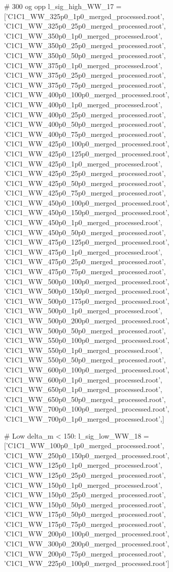 # 300 og opp
l_sig_high_WW_17 = ['C1C1_WW_325p0_1p0_merged_processed.root',
'C1C1_WW_325p0_25p0_merged_processed.root',
'C1C1_WW_350p0_1p0_merged_processed.root',
'C1C1_WW_350p0_25p0_merged_processed.root',
'C1C1_WW_350p0_50p0_merged_processed.root',
'C1C1_WW_375p0_1p0_merged_processed.root',
'C1C1_WW_375p0_25p0_merged_processed.root',
'C1C1_WW_375p0_75p0_merged_processed.root',
'C1C1_WW_400p0_100p0_merged_processed.root',
'C1C1_WW_400p0_1p0_merged_processed.root',
'C1C1_WW_400p0_25p0_merged_processed.root',
'C1C1_WW_400p0_50p0_merged_processed.root',
'C1C1_WW_400p0_75p0_merged_processed.root',
'C1C1_WW_425p0_100p0_merged_processed.root',
'C1C1_WW_425p0_125p0_merged_processed.root',
'C1C1_WW_425p0_1p0_merged_processed.root',
'C1C1_WW_425p0_25p0_merged_processed.root',
'C1C1_WW_425p0_50p0_merged_processed.root',
'C1C1_WW_425p0_75p0_merged_processed.root',
'C1C1_WW_450p0_100p0_merged_processed.root',
'C1C1_WW_450p0_150p0_merged_processed.root',
'C1C1_WW_450p0_1p0_merged_processed.root',
'C1C1_WW_450p0_50p0_merged_processed.root',
'C1C1_WW_475p0_125p0_merged_processed.root',
'C1C1_WW_475p0_1p0_merged_processed.root',
'C1C1_WW_475p0_25p0_merged_processed.root',
'C1C1_WW_475p0_75p0_merged_processed.root',
'C1C1_WW_500p0_100p0_merged_processed.root',
'C1C1_WW_500p0_150p0_merged_processed.root',
'C1C1_WW_500p0_175p0_merged_processed.root',
'C1C1_WW_500p0_1p0_merged_processed.root',
'C1C1_WW_500p0_200p0_merged_processed.root',
'C1C1_WW_500p0_50p0_merged_processed.root',
'C1C1_WW_550p0_100p0_merged_processed.root',
'C1C1_WW_550p0_1p0_merged_processed.root',
'C1C1_WW_550p0_50p0_merged_processed.root',
'C1C1_WW_600p0_100p0_merged_processed.root',
'C1C1_WW_600p0_1p0_merged_processed.root',
'C1C1_WW_650p0_1p0_merged_processed.root',
'C1C1_WW_650p0_50p0_merged_processed.root',
'C1C1_WW_700p0_100p0_merged_processed.root',
'C1C1_WW_700p0_1p0_merged_processed.root',]


# Low delta_m < 150:
l_sig_low_WW_18 = ['C1C1_WW_100p0_1p0_merged_processed.root',
                'C1C1_WW_250p0_150p0_merged_processed.root',
                'C1C1_WW_125p0_1p0_merged_processed.root',
                'C1C1_WW_125p0_25p0_merged_processed.root',
                'C1C1_WW_150p0_1p0_merged_processed.root',
                'C1C1_WW_150p0_25p0_merged_processed.root',
                'C1C1_WW_150p0_50p0_merged_processed.root',
                'C1C1_WW_175p0_50p0_merged_processed.root',
                'C1C1_WW_175p0_75p0_merged_processed.root',
                'C1C1_WW_200p0_100p0_merged_processed.root',
                'C1C1_WW_300p0_200p0_merged_processed.root',
                'C1C1_WW_200p0_75p0_merged_processed.root',
                'C1C1_WW_225p0_100p0_merged_processed.root']


